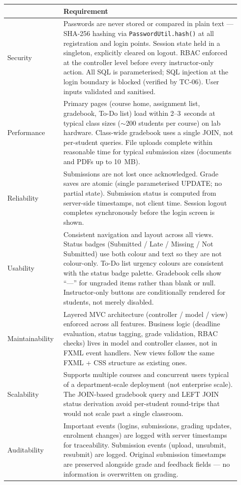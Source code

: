 \documentclass[12pt, a4paper]{article}
\newcommand{\fcol}[1]{\textbf{\color{primary}{#1}}}
\begin{document}
\begin{center}
\begin{tabular}{@{}p{0.22\linewidth}@{\hspace{6pt}}p{0.72\linewidth}@{}}
  \toprule
  \fcol{NFR Category} & Requirement \\
  \midrule
  Security
    & Passwords are never stored or compared in plain text --- SHA-256
      hashing via \texttt{PasswordUtil.hash()} at all registration and
      login points. Session state held in a singleton, explicitly cleared on
      logout. RBAC enforced at the controller level before every
      instructor-only action. All SQL is parameterised; SQL injection at the
      login boundary is blocked (verified by TC-06). User inputs validated
      and sanitised. \\[6pt]
  Performance
    & Primary pages (course home, assignment list, gradebook, To-Do list)
      load within 2--3~seconds at typical class sizes ($\sim$200 students per
      course) on lab hardware. Class-wide gradebook uses a single JOIN, not
      per-student queries. File uploads complete within reasonable time for
      typical submission sizes (documents and PDFs up to 10~MB). \\[6pt]
  Reliability
    & Submissions are not lost once acknowledged. Grade saves are atomic
      (single parameterised UPDATE; no partial state). Submission status is
      computed from server-side timestamps, not client time. Session logout
      completes synchronously before the login screen is shown. \\[6pt]
  Usability
    & Consistent navigation and layout across all views. Status badges
      (Submitted / Late / Missing / Not Submitted) use both colour and text
      so they are not colour-only. To-Do list urgency colours are consistent
      with the status badge palette. Gradebook cells show ``---'' for
      ungraded items rather than blank or null. Instructor-only buttons are
      conditionally rendered for students, not merely disabled. \\[6pt]
  Maintainability
    & Layered MVC architecture (controller / model / view) enforced across
      all features. Business logic (deadline evaluation, status tagging,
      grade validation, RBAC checks) lives in model and controller classes,
      not in FXML event handlers. New views follow the same FXML + CSS
      structure as existing ones. \\[6pt]
  Scalability
    & Supports multiple courses and concurrent users typical of a
      department-scale deployment (not enterprise scale). The JOIN-based
      gradebook query and LEFT JOIN status derivation avoid per-student
      round-trips that would not scale past a single classroom. \\[6pt]
  Auditability
    & Important events (logins, submissions, grading updates, enrolment
      changes) are logged with server timestamps for traceability. Submission
      events (upload, unsubmit, resubmit) are logged. Original submission
      timestamps are preserved alongside grade and feedback fields --- no
      information is overwritten on grading. \\
  \bottomrule
\end{tabular}
\end{center}
\end{document}
